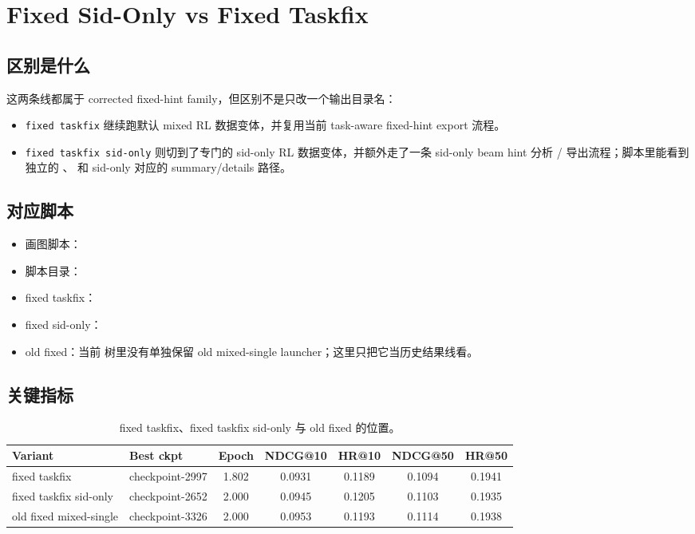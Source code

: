 \section{Fixed Sid-Only vs Fixed Taskfix}

\subsection{区别是什么}

这两条线都属于 corrected fixed-hint family，但区别不是只改一个输出目录名：

\begin{itemize}
\item \texttt{fixed taskfix} 继续跑默认 mixed RL 数据变体，并复用当前 task-aware fixed-hint export 流程。
\item \texttt{fixed taskfix sid-only} 则切到了专门的 sid-only RL 数据变体，并额外走了一条 sid-only beam hint 分析 / 导出流程；脚本里能看到独立的 、 和 sid-only 对应的 summary/details 路径。
\end{itemize}

\subsection{对应脚本}

{\footnotesize
\begin{itemize}
\item 画图脚本：
\item 脚本目录：
\item fixed taskfix：
\item fixed sid-only：
\item old fixed：当前  树里没有单独保留 old mixed-single launcher；这里只把它当历史结果线看。
\end{itemize}
}

\subsection{关键指标}

\begin{table}[H]
\centering
\small
\setlength{\tabcolsep}{4pt}
\begin{tabular}{p{4.0cm} p{2.5cm} c c c c c}
\toprule
Variant & Best ckpt & Epoch & NDCG@10 & HR@10 & NDCG@50 & HR@50 \\
\midrule
fixed taskfix & checkpoint-2997 & 1.802 & 0.0931 & 0.1189 & 0.1094 & 0.1941 \\
fixed taskfix sid-only & checkpoint-2652 & 2.000 & 0.0945 & 0.1205 & 0.1103 & 0.1935 \\
old fixed mixed-single & checkpoint-3326 & 2.000 & 0.0953 & 0.1193 & 0.1114 & 0.1938 \\
\bottomrule
\end{tabular}
\caption{fixed taskfix、fixed taskfix sid-only 与 old fixed 的位置。}
\end{table}


